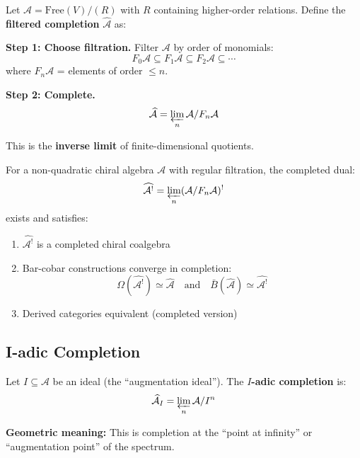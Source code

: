 \begin{definition}\label{def:filtered-completion}
Let $\mathcal{A} = \text{Free}(V) / (R)$ with $R$ containing higher-order relations. 
Define the \textbf{filtered completion} $\widehat{\mathcal{A}}$ as:

\textbf{Step 1: Choose filtration.}
Filter $\mathcal{A}$ by order of monomials:
$$F_0\mathcal{A} \subseteq F_1\mathcal{A} \subseteq F_2\mathcal{A} \subseteq \cdots$$
where $F_n\mathcal{A}$ = elements of order $\leq n$.

\textbf{Step 2: Complete.}
$$\widehat{\mathcal{A}} = \varprojlim_n \mathcal{A} / F_n\mathcal{A}$$

This is the \textbf{inverse limit} of finite-dimensional quotients.
\end{definition}

\begin{theorem}\label{thm:completed-koszul-dual}
For a non-quadratic chiral algebra $\mathcal{A}$ with regular filtration, the 
completed dual:
$$\widehat{\mathcal{A}^!} = \varprojlim_n (\mathcal{A} / F_n\mathcal{A})^!$$
exists and satisfies:
\begin{enumerate}
\item $\widehat{\mathcal{A}^!}$ is a completed chiral coalgebra
\item Bar-cobar constructions converge in completion:
      $$\Omega(\widehat{\mathcal{A}^!}) \simeq \widehat{\mathcal{A}} \quad \text{and} \quad 
      \bar{B}(\widehat{\mathcal{A}}) \simeq \widehat{\mathcal{A}^!}$$
\item Derived categories equivalent (completed version)
\end{enumerate}
\end{theorem}

\subsection{I-adic Completion}

\begin{definition}\label{def:i-adic-completion}
Let $I \subseteq \mathcal{A}$ be an ideal (the ``augmentation ideal''). The 
\textbf{$I$-adic completion} is:
$$\widehat{\mathcal{A}}_I = \varprojlim_n \mathcal{A} / I^n$$

\textbf{Geometric meaning:} This is completion at the ``point at infinity'' or 
``augmentation point'' of the spectrum.
\end{definition}

